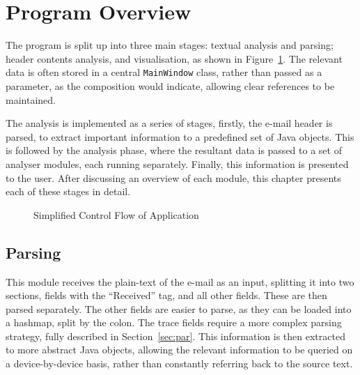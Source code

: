 \section{Program Overview}

The program is split up into three main stages: textual analysis and parsing; header contents analysis, and visualisation, as shown in Figure~\ref{fig:con}.  The relevant data is often stored in a central \texttt{MainWindow} class, rather than passed as a parameter, as the composition would indicate, allowing clear references to be maintained.

The  analysis is implemented as a series of stages, firstly, the e-mail header
is parsed, to extract important information to a predefined set of Java objects.
This is followed by the analysis phase, where the resultant data is passed to a
set of analyser modules, each running separately.  Finally, this information is
presented to the user.  After discussing an overview of each module, this chapter 
presents each of these stages in detail.

\begin{figure}
	\centering
{}
\caption{Simplified Control Flow of Application}
\label{fig:con}
\end{figure}

\subsection{Parsing}

This module receives the plain-text of the e-mail as an input, splitting it into two sections, fields with the ``Received'' tag, and all other fields.  These are then parsed separately.  The other fields are easier to parse, as they can be loaded into a hashmap, split by the colon.  The trace fields require a more complex parsing strategy, fully described in Section~\ref{sec:par}.  This information is then extracted to more abstract Java objects, allowing the relevant information to be queried on a device-by-device basis, rather than constantly referring back to the source text.

